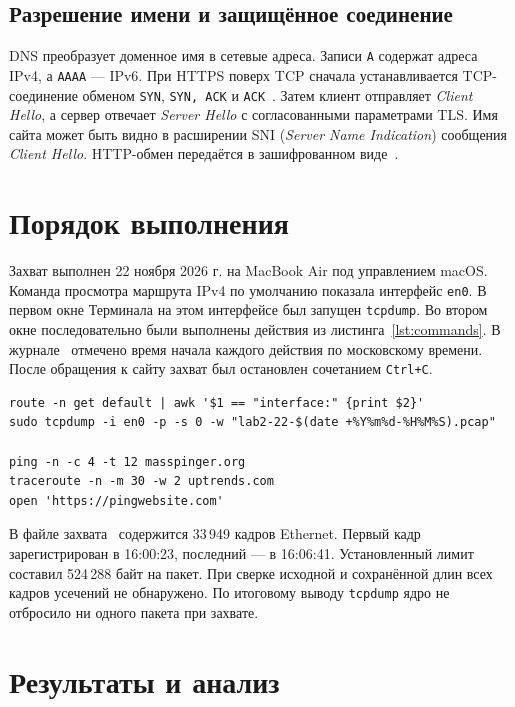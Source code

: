 \documentclass[a4paper,14pt]{extarticle}
\begin{document}
\subsection{Разрешение имени и защищённое соединение}

DNS преобразует доменное имя в сетевые адреса. Записи \texttt{A} содержат адреса IPv4, а \texttt{AAAA} --- IPv6. При HTTPS поверх TCP сначала устанавливается TCP-соединение обменом \texttt{SYN}, \texttt{SYN, ACK} и \texttt{ACK}~\cite{tcp}. Затем клиент отправляет \textit{Client Hello}, а сервер отвечает \textit{Server Hello} с согласованными параметрами TLS. Имя сайта может быть видно в расширении SNI (\textit{Server Name Indication}) сообщения \textit{Client Hello}. HTTP-обмен передаётся в зашифрованном виде~\cite{tls}.

\section{Порядок выполнения}

Захват выполнен 22 ноября 2026 г. на MacBook Air под управлением macOS. Команда просмотра маршрута IPv4 по умолчанию показала интерфейс \texttt{en0}. В первом окне Терминала на этом интерфейсе был запущен \texttt{tcpdump}. Во втором окне последовательно были выполнены действия из листинга~\ref{lst:commands}. В журнале~\cite{commandlog} отмечено время начала каждого действия по московскому времени. После обращения к сайту захват был остановлен сочетанием \texttt{Ctrl+C}.

\begin{lstlisting}[caption={Команды захвата и генерации трафика},label={lst:commands}]
route -n get default | awk '$1 == "interface:" {print $2}'
sudo tcpdump -i en0 -p -s 0 -w "lab2-22-$(date +%Y%m%d-%H%M%S).pcap"

ping -n -c 4 -t 12 masspinger.org
traceroute -n -m 30 -w 2 uptrends.com
open 'https://pingwebsite.com'
\end{lstlisting}

В файле захвата~\cite{capture} содержится 33\,949 кадров Ethernet. Первый кадр зарегистрирован в 16:00:23, последний --- в 16:06:41. Установленный лимит составил 524\,288 байт на пакет. При сверке исходной и сохранённой длин всех кадров усечений не обнаружено. По итоговому выводу \texttt{tcpdump} ядро не отбросило ни одного пакета при захвате.

\section{Результаты и анализ}
\end{document}
